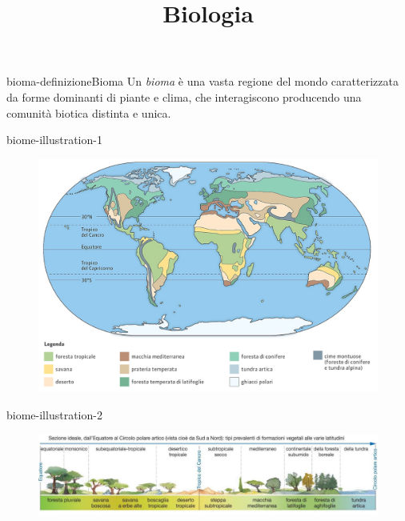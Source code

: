 \documentclass[preview]{standalone}
\begin{document}
\title{Biologia}
\genpage

\begin{snippetdefinition}{bioma-definizione}{Bioma}
    Un \textit{bioma} è una vasta regione del mondo caratterizzata da forme dominanti
    di piante e clima, che interagiscono producendo una comunità biotica distinta e unica.
\end{snippetdefinition}

\begin{snippet}{biome-illustration-1}
    \begin{center}
    \begin{figure}[th]
        \centering
        \includegraphics[width=\textwidth]{./resources/biomi1.png}
    \end{figure}
    \end{center}
\end{snippet}


\begin{snippet}{biome-illustration-2}
    \begin{center}
    \begin{figure}[th]
        \centering
        \includegraphics[width=\textwidth]{./resources/biomi2.png}
    \end{figure}
    \end{center}
\end{snippet}
\end{document}
